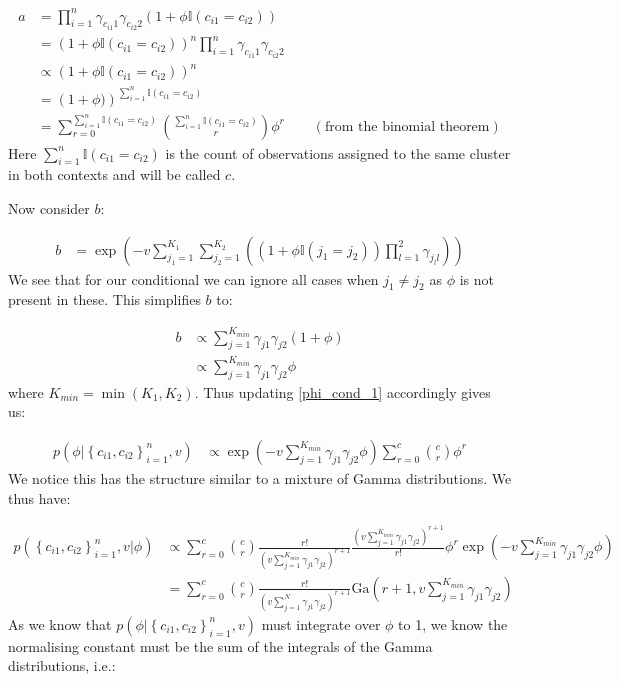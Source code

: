 \documentclass[fleqn,11pt]{wlscirep}
\begin{document}
\begin{align}
a &= \prod_{i = 1}^n \gamma_{c_{i1}1} \gamma_{c_{i2}2}  \left(1 + \phi \mathbb{I}(c_{i1} = c_{i2})\right) \\
 &= \left(1 + \phi \mathbb{I}(c_{i1} = c_{i2})\right)^n \prod_{i = 1}^n \gamma_{c_{i1}1} \gamma_{c_{i2}2} \\
 &\propto  \left(1 + \phi \mathbb{I}(c_{i1} = c_{i2})\right)^n \\
 &=  \left(1 + \phi)\right)^{\sum_{i=1}^n  \mathbb{I}(c_{i1} = c_{i2})} \\
 &= \sum_{r=0}^{\sum_{i=1}^n  \mathbb{I}(c_{i1} = c_{i2})} \binom{\sum_{i=1}^n  \mathbb{I}(c_{i1} = c_{i2})}{r} \phi^r \qquad (\text{from the binomial theorem})
\end{align}
Here $\sum_{i=1}^n  \mathbb{I}(c_{i1} = c_{i2})$ is the count of observations assigned to the same cluster in both contexts and will be called $c$.

Now consider $b$:

\begin{align}
b &=  \exp\left(-v \sum_{j_1=1}^{K_1}\sum_{j_2=1}^{K_2}\left(\left(1 + \phi \mathbb{I}(j_1 = j_2)\right) \prod_{l=1}^2\gamma_{j_ll}\right)\right)
\end{align}
We see that for our conditional we can ignore all cases when $j_1 \neq j_2$ as $\phi$ is not present in these. This simplifies $b$ to:

\begin{align}
b &\propto \sum_{j=1}^{K_{min}} \gamma_{j1} \gamma_{j2} \left(1 + \phi \right) \\
&\propto \sum_{j=1}^{K_{min}} \gamma_{j1} \gamma_{j2} \phi
\end{align}
where $K_{min} = \min(K_1, K_2)$. Thus updating \eqref{phi_cond_1} accordingly gives us:

\begin{align}
p(\phi | \left\{c_{i1}, c_{i2}\right\}_{i=1}^n, v) &\propto \exp\left(-v \sum_{j=1}^{K_{min}} \gamma_{j1} \gamma_{j2}\phi \right)  \sum_{r=0}^c \binom{c}{r} \phi^r
\end{align}
We notice this has the structure similar to a mixture of Gamma distributions. We thus have:

\begin{align}
 p(\left\{c_{i1}, c_{i2}\right\}_{i=1}^n, v | \phi) &\propto  \sum_{r=0}^c \binom{c}{r} \frac{r!}{\left(v \sum_{j=1}^{K_{min}} \gamma_{j1} \gamma_{j2}\right)^{r+1}}  \frac{\left(v \sum_{j=1}^{K_{min}} \gamma_{j1} \gamma_{j2}\right)^{r+1}}{r!}\phi^r \exp\left(-v \sum_{j=1}^{K_{min}} \gamma_{j1} \gamma_{j2}\phi \right) \\
&= \sum_{r=0}^c  \binom{c}{r} \frac{r!}{\left(v \sum_{j=1}^N \gamma_{j1} \gamma_{j2}\right)^{r+1}} \mathrm{Ga}\left(r+1, v \sum_{j=1}^{K_{min}} \gamma_{j1} \gamma_{j2} \right)
\end{align}
As we know that $p(\phi | \left\{c_{i1}, c_{i2}\right\}_{i=1}^n, v)$ must integrate over $\phi$ to 1, we know the normalising constant must be the sum of the integrals of the Gamma distributions, i.e.:
\end{document}
